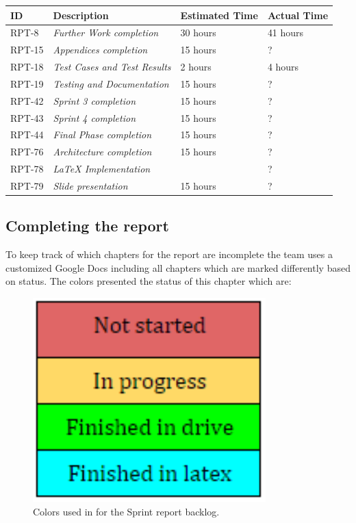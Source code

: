 \begin{minipage}{\linewidth}
\setlength{\tabcolsep}{12pt}
\centering
{}
\begin{tabular}{|p{1cm}|p{4cm}|p{2cm}|p{2cm}|}
\hline
\cellcolor{gray!25} ID & \cellcolor{gray!25} Description & \cellcolor{gray!25} Estimated Time & \cellcolor{gray!25} Actual Time \\
\hline
RPT-8 & \it{Further Work completion} & 30 hours & 41 hours\\
RPT-15 & \it{Appendices completion} & 15 hours & ? \\
RPT-18 & \it{Test Cases and Test Results} &  2 hours & 4 hours \\
RPT-19 & \it{Testing and Documentation} & 15 hours & ? \\
RPT-42 & \it{Sprint 3 completion} & 15 hours & ? \\
RPT-43 & \it{Sprint 4 completion} & 15 hours & ? \\
RPT-44 & \it{Final Phase completion} & 15 hours & ? \\
RPT-76 & \it{Architecture completion} & 15 hours & ? \\
RPT-78 & \it{LaTeX Implementation} &  & ? \\
RPT-79 & \it{Slide presentation} & 15 hours & ? \\
\hline
\end{tabular}
\end{minipage}

\subsection{Completing the report}
\label{sec:FinalReport}

To keep track of which chapters for the report are incomplete the team uses a customized Google Docs including all chapters which are marked differently based on status. The colors presented the status of this chapter which are:

\begin{figure}[ht!]
\centering
\includegraphics[width=90mm]{./FinalSprint/img/Colors.png}
\caption{Colors used in for the Sprint report backlog. \label{fig:FinalColors}}
\end{figure}

